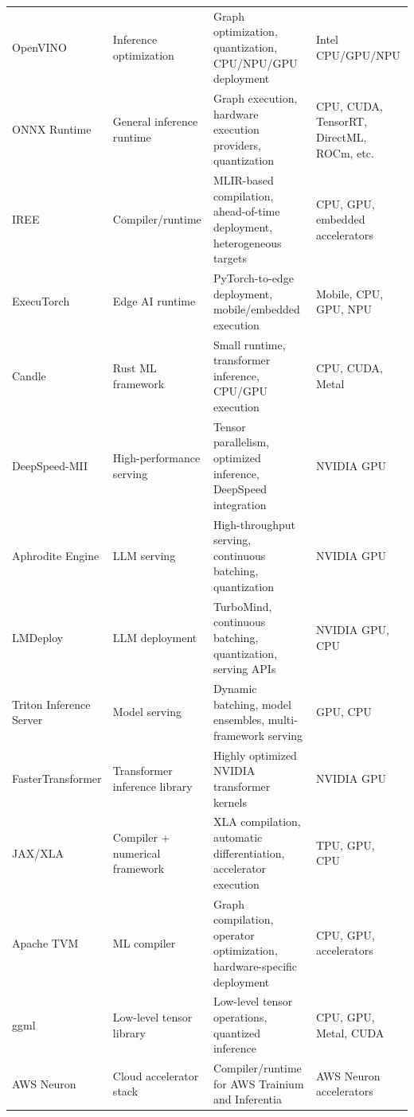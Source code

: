 \documentclass[11pt,a4paper]{article}
\begin{document}
\begin{longtable}{p{3.2cm} p{3.0cm} p{5.0cm} p{3.2cm}}
OpenVINO &
Inference optimization &
Graph optimization, quantization, CPU/NPU/GPU deployment &
Intel CPU/GPU/NPU \\

ONNX Runtime &
General inference runtime &
Graph execution, hardware execution providers,
quantization &
CPU, CUDA, TensorRT, DirectML, ROCm, etc. \\

IREE &
Compiler/runtime &
MLIR-based compilation, ahead-of-time deployment,
heterogeneous targets &
CPU, GPU, embedded accelerators \\

ExecuTorch &
Edge AI runtime &
PyTorch-to-edge deployment, mobile/embedded execution &
Mobile, CPU, GPU, NPU \\

Candle &
Rust ML framework &
Small runtime, transformer inference, CPU/GPU execution &
CPU, CUDA, Metal \\

DeepSpeed-MII &
High-performance serving &
Tensor parallelism, optimized inference,
DeepSpeed integration &
NVIDIA GPU \\

Aphrodite Engine &
LLM serving &
High-throughput serving, continuous batching,
quantization &
NVIDIA GPU \\

LMDeploy &
LLM deployment &
TurboMind, continuous batching, quantization,
serving APIs &
NVIDIA GPU, CPU \\

Triton Inference Server &
Model serving &
Dynamic batching, model ensembles, multi-framework serving &
GPU, CPU \\

FasterTransformer &
Transformer inference library &
Highly optimized NVIDIA transformer kernels &
NVIDIA GPU \\

JAX/XLA &
Compiler + numerical framework &
XLA compilation, automatic differentiation,
accelerator execution &
TPU, GPU, CPU \\

Apache TVM &
ML compiler &
Graph compilation, operator optimization,
hardware-specific deployment &
CPU, GPU, accelerators \\

ggml &
Low-level tensor library &
Low-level tensor operations, quantized inference &
CPU, GPU, Metal, CUDA \\

AWS Neuron &
Cloud accelerator stack &
Compiler/runtime for AWS Trainium and Inferentia &
AWS Neuron accelerators \\

\bottomrule
\end{longtable}
\end{document}
